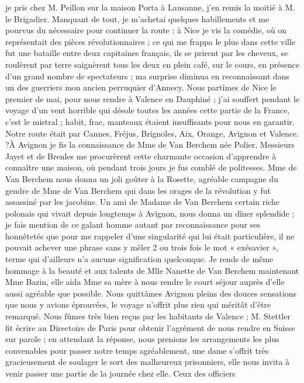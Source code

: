 \documentclass[12pt]{article}
\begin{document}
 je pris chez M. Peillon sur la maison Porta à Lausanne,
j’en remis la moitié à M. le Brigadier. Manquant de tout, je m’achetai quelques habillements et me
pourvus du nécessaire pour continuer la route ; à Nice je vis la comédie, où on représentait des
pièces révolutionnaires ; ce qui me frappa le plus dans cette ville fut une bataille entre deux
capitaines français, ils se prirent par les cheveux, se roulèrent par terre saignèrent tous les deux
en plein café, sur le cours, en présence d’un grand nombre de spectateurs ; ma surprise diminua en
reconnaissant dans un des guerriers mon ancien perruquier d’Annecy. Nous partîmes de Nice le premier
de mai, pour nous rendre à Valence en Dauphiné ; j’ai souffert pendant le voyage d’un vent horrible
qui désole toutes les années cette partie de la France, c’est le mistral ; habit, frac, manteaux
étaient insuffisants pour nous en garantir. Notre route était par Cannes, Fréjus, Brignoles, Aix,
Orange, Avignon et Valence. ?À Avignon je fis la connaissance de Mme de Van Berchem née Polier,
Messieurs Jayet et de Brenles me procurèrent cette charmante occasion d’apprendre à connaître une
maison, où pendant trois jours je fus comblé de politesses. Mme de Van Berchem nous donna un joli
goûter à la Rosette, agréable campagne du gendre de Mme de Van Berchem qui dans les orages de la
révolution y fut assassiné par les jacobins. Un ami de Madame de Van Berchem certain riche polonais
qui vivait depuis longtemps à Avignon, nous donna un dîner splendide ; je fais mention de ce galant
homme autant par reconnaissance pour ses honnêtetés que pour me rappeler d’une singularité qui lui
était particulière, il ne pouvait achever une phrase sans y mêler 2 ou trois fois le mot « exésavier
», terme qui d’ailleurs n’a aucune signification quelconque. Je rends de même hommage à la beauté et
aux talents de Mlle Nanette de Van Berchem maintenant Mme Bazin, elle aida Mme sa mère à nous rendre
le court séjour auprès d’elle aussi agréable que possible. Nous quittâmes Avignon pleins des douces
sensations que nous y avions éprouvées, le voyage n’offrit plus rien qui méritât d’être remarqué.
Nous fûmes très bien reçus par les habitants de Valence ; M. Stettler fit écrire au Directoire de
Paris pour obtenir l’agrément de nous rendre en Suisse sur parole ; en attendant la réponse, nous
prenions les arrangements les plus convenables pour passer notre temps agréablement, une dame
s’offrit très gracieusement de soulager le sort des malheureux prisonniers, elle nous invita à venir
passer une partie de la journée chez elle. Ceux des officiers
\end{document}
